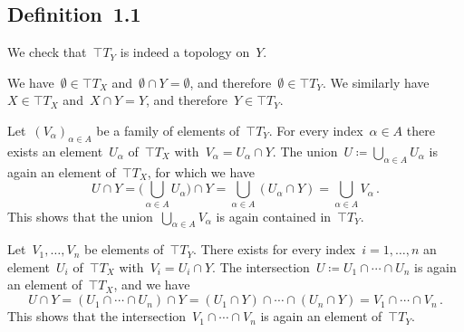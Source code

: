 \subsection{Definition~1.1}

We check that~$\top{T}_Y$ is indeed a topology on~$Y$.

We have~$∅ ∈ \top{T}_X$ and~$∅ ∩ Y = ∅$, and therefore~$∅ ∈ \top{T}_Y$.
We similarly have~$X ∈ \top{T}_X$ and~$X ∩ Y = Y$, and therefore~$Y ∈ \top{T}_Y$.

Let~$(V_α)_{α ∈ A}$ be a family of elements of~$\top{T}_Y$.
For every index~$α ∈ A$ there exists an element~$U_α$ of~$\top{T}_X$ with~$V_α = U_α ∩ Y$.
The union~$U ≔ ⋃_{α ∈ A} U_α$ is again an element of~$\top{T}_X$, for which we have
\[
	U ∩ Y
	=
	\Biggl( ⋃_{α ∈ A} U_α \Biggr) ∩ Y
	=
	⋃_{α ∈ A} {} (U_α ∩ Y)
	=
	⋃_{α ∈ A} V_α \,.
\]
This shows that the union~$⋃_{α ∈ A} V_α$ is again contained in~$\top{T}_Y$.

Let~$V_1, \dotsc, V_n$ be elements of~$\top{T}_Y$.
There exists for every index~$i = 1, \dotsc, n$ an element~$U_i$ of~$\top{T}_X$ with~$V_i = U_i ∩ Y$.
The intersection~$U ≔ U_1 ∩ \dotsb ∩ U_n$ is again an element of~$\top{T}_X$, and we have
\[
	U ∩ Y
	=
	(U_1 ∩ \dotsb ∩ U_n) ∩ Y
	=
	(U_1 ∩ Y) ∩ \dotsb ∩ (U_n ∩ Y)
	=
	V_1 ∩ \dotsb ∩ V_n \,.
\]
This shows that the intersection~$V_1 ∩ \dotsb ∩ V_n$ is again an element of~$\top{T}_Y$.
